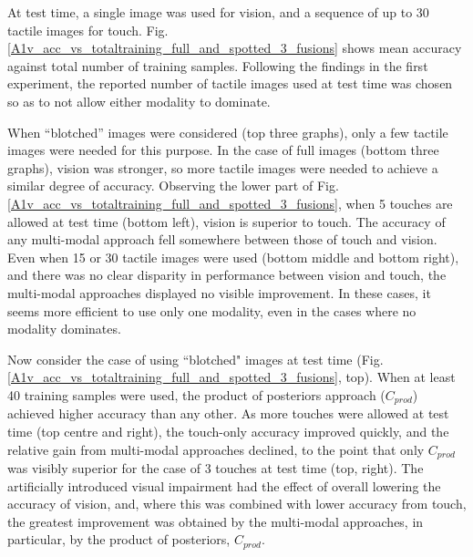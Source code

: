 \documentclass[9pt,technote]{IEEEtran}  %
\begin{document}
At test time, a single image was used for vision, and a sequence of up to 30 tactile images for touch. Fig. \ref{A1v_acc_vs_totaltraining_full_and_spotted_3_fusions} shows mean accuracy against total number of training samples. Following the findings in the first experiment, the reported number of tactile images used at test time was chosen so as to not allow either modality to dominate. 

When ``blotched'' images were considered (top three graphs), only a few tactile images were needed for this purpose. In the case of full images (bottom three graphs), vision was stronger, so more tactile images were needed to achieve a similar degree of accuracy. Observing the lower part of Fig. \ref{A1v_acc_vs_totaltraining_full_and_spotted_3_fusions}, when 5 touches are allowed at test time (bottom left), vision is superior to touch. The accuracy of any multi-modal approach fell somewhere between those of touch and vision. Even when 15 or 30 tactile images were used (bottom middle and bottom right), and there was no clear disparity in performance between vision and touch, the multi-modal approaches displayed no visible improvement. In these cases, it seems more efficient to use only one modality, even in the cases where no modality dominates. 

Now consider the case of using ``blotched" images at test time (Fig. \ref{A1v_acc_vs_totaltraining_full_and_spotted_3_fusions}, top). When at least 40 training samples were used, the product of posteriors approach ($C_{prod}$) achieved higher accuracy than any other. As more touches were allowed at test time (top centre and right), the touch-only accuracy improved quickly, and the relative gain from multi-modal approaches declined, to the point that only $C_{prod}$ was visibly superior for the case of 3 touches at test time (top, right).
The artificially introduced visual impairment had the effect of overall lowering the accuracy of vision, and, where this was combined with lower accuracy from touch, the greatest improvement was obtained by the multi-modal approaches, in particular, by the product of posteriors, $C_{prod}$.
\begin{figure}
	\centering
	\end{figure}
	
\end{document}
